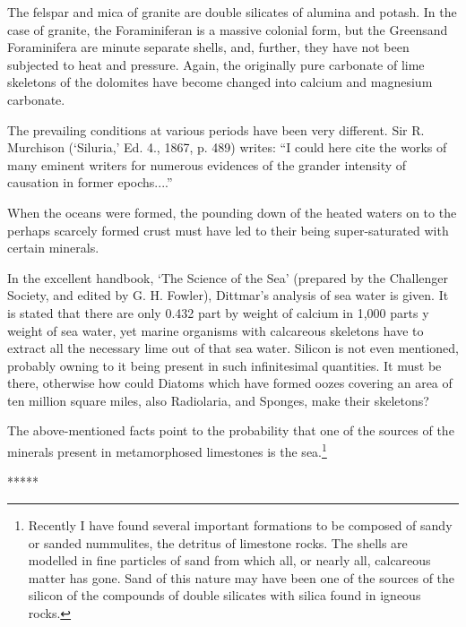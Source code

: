 \documentclass[a4paper, 12pt, oneside]{article}
\begin{document}
The felspar and mica of granite are double silicates of alumina and potash. In the case of granite, the Foraminiferan is a massive colonial form, but the Greensand Foraminifera are minute separate shells, and, further, they have not been subjected to heat and pressure. Again, the originally pure carbonate of lime skeletons of the dolomites have become changed into calcium and magnesium carbonate.

The prevailing conditions at various periods have been very different. Sir R. Murchison (`Siluria,' Ed. 4., 1867, p. 489) writes: ``I could here cite the works of many eminent writers for numerous evidences of the grander intensity of causation in former epochs....''

When the oceans were formed, the pounding down of the heated waters on to the perhaps scarcely formed crust must have led to their being super-saturated with certain minerals.

In the excellent handbook, `The Science of the Sea' (prepared by the Challenger Society, and edited by G. H. Fowler), Dittmar's analysis of sea water is given. It is stated that there are only 0.432 part by weight of calcium in 1,000 parts y weight of sea water, yet marine organisms with calcareous skeletons have to extract all the necessary lime out of that sea water. Silicon is not even mentioned, probably owning to it being present in such infinitesimal quantities. It must be there, otherwise how could Diatoms which have formed oozes covering an area of ten million square miles, also Radiolaria, and Sponges, make their skeletons?

The above-mentioned facts point to the probability that one of the sources of the minerals present in metamorphosed limestones is the sea.\footnote{Recently I have found several important formations to be composed of sandy or sanded nummulites, the detritus of limestone rocks. The shells are modelled in fine particles of sand from which all, or nearly all, calcareous matter has gone. Sand of this nature may have been one of the sources of the silicon of the compounds of double silicates with silica found in igneous rocks.}

\centerline{*\hspace{15mm}*\hspace{15mm}*\hspace{15mm}*\hspace{15mm}*}
\bigskip
\end{document}
